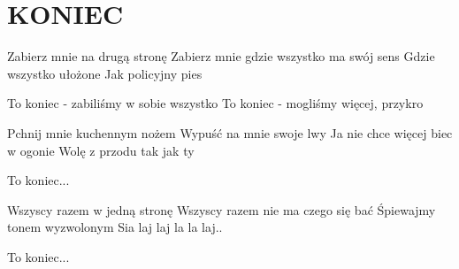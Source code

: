 \documentclass[../../../songbook.tex]{subfiles}
\begin{document}
\TabPositions{8cm} %
\section*{KONIEC}
{}
\vspace{0.5cm}
Zabierz mnie na drugą stronę				 \newline
Zabierz mnie gdzie wszystko ma swój sens	 \newline		
Gdzie wszystko ułożone						 \newline	
Jak policyjny pies							 \newline				

\-\hspace{1cm} To koniec - zabiliśmy w sobie wszystko	 \newline	
\-\hspace{1cm} To koniec - mogliśmy więcej, przykro	 \newline

Pchnij mnie kuchennym nożem			 \newline
Wypuść na mnie swoje lwy		 \newline
Ja nie chce więcej biec w ogonie		 \newline
Wolę z przodu tak jak ty		 \newline

\-\hspace{1cm} To koniec...		 \newline

Wszyscy razem w jedną stronę		 \newline
Wszyscy razem nie ma czego się bać		 \newline
Śpiewajmy tonem wyzwolonym		 \newline
Sia laj laj la la laj..		 \newline

\-\hspace{1cm} To koniec...		 \newline
\end{document}
